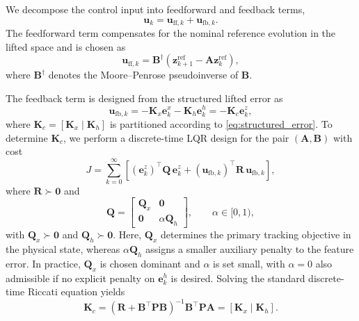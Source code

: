 \documentclass[journal]{IEEEtran}
\newcommand{\vu}{\mathbf{u}}
\newcommand{\vz}{\mathbf{z}}
\newcommand{\ve}{\mathbf{e}}
\newcommand{\mA}{\mathbf{A}}
\newcommand{\mB}{\mathbf{B}}
\newcommand{\mQ}{\mathbf{Q}}
\newcommand{\mR}{\mathbf{R}}
\newcommand{\mP}{\mathbf{P}}
\newcommand{\mK}{\mathbf{K}}
\begin{document}
We decompose the control input into feedforward and feedback terms,
\begin{equation}
    \vu_k = \vu_{\mathrm{ff},k} + \vu_{\mathrm{fb},k}.
    \label{eq:control_decomposition}
\end{equation}
The feedforward term compensates for the nominal reference evolution in the lifted space and is chosen as
\begin{equation}
    \vu_{\mathrm{ff},k}
    =
    \mB^\dagger \!\left(\vz_{k+1}^{\mathrm{ref}} - \mA \vz_k^{\mathrm{ref}}\right),
    \label{eq:feedforward}
\end{equation}
where $\mB^\dagger$ denotes the Moore--Penrose pseudoinverse of $\mB$.

The feedback term is designed from the structured lifted error as
\begin{equation}
    \vu_{\mathrm{fb},k}
    =
    -\mK_x \ve_k^x - \mK_h \ve_k^h
    =
    -\mK_c \ve_k^z,
    \label{eq:hierarchical_fb}
\end{equation}
where $\mK_c = [\mK_x\;|\;\mK_h]$ is partitioned according to \eqref{eq:structured_error}. To determine $\mK_c$, we perform a discrete-time LQR design for the pair $(\mA,\mB)$ with cost
\begin{equation}
    J = \sum_{k=0}^{\infty}
    \left[
        (\ve_k^z)^\top \mQ\,\ve_k^z
        +
        (\vu_{\mathrm{fb},k})^\top \mR\,\vu_{\mathrm{fb},k}
    \right],
    \label{eq:lqr_objective}
\end{equation}
where $\mR \succ \mathbf{0}$ and
\begin{equation}
    \mQ =
    \begin{bmatrix}
        \mQ_x & \mathbf{0} \\
        \mathbf{0} & \alpha \mQ_h
    \end{bmatrix},
    \qquad \alpha \in [0,1),
    \label{eq:block_diag_Q}
\end{equation}
with $\mQ_x \succ \mathbf{0}$ and $\mQ_h \succ \mathbf{0}$. Here, $\mQ_x$ determines the primary tracking objective in the physical state, whereas $\alpha \mQ_h$ assigns a smaller auxiliary penalty to the feature error. In practice, $\mQ_x$ is chosen dominant and $\alpha$ is set small, with $\alpha = 0$ also admissible if no explicit penalty on $\ve_k^h$ is desired. Solving the standard discrete-time Riccati equation yields
\begin{equation}
    \mK_c
    =
    (\mR + \mB^\top \mP \mB)^{-1} \mB^\top \mP \mA
    =
    [\mK_x\;|\;\mK_h].
    \label{eq:lqr_gain}
\end{equation}
\end{document}

